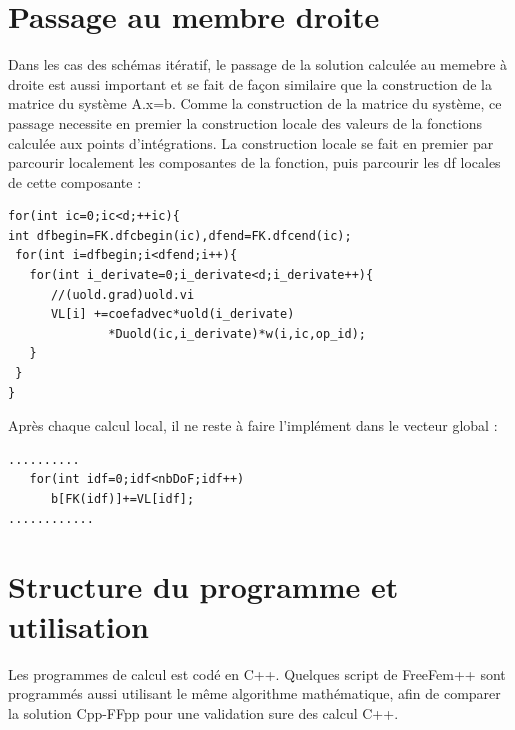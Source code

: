 \documentclass{book}
\begin{document}
\section{Passage au membre droite}
Dans les cas des schémas itératif, le passage de la solution calculée au memebre à droite est aussi important et se fait de façon similaire que la construction de la matrice du système A.x=b. Comme la construction de la matrice du système, ce passage necessite en premier la construction locale des valeurs de la fonctions calculée aux points d'intégrations. La construction locale se fait en premier par parcourir localement les composantes de la fonction, puis parcourir les df locales de cette composante : 
\begin{lstlisting}
for(int ic=0;ic<d;++ic){
int dfbegin=FK.dfcbegin(ic),dfend=FK.dfcend(ic);
 for(int i=dfbegin;i<dfend;i++){
   for(int i_derivate=0;i_derivate<d;i_derivate++){
      //(uold.grad)uold.vi
      VL[i] +=coefadvec*uold(i_derivate)
              *Duold(ic,i_derivate)*w(i,ic,op_id);
   }
 }
}
\end{lstlisting}
Après chaque calcul local, il ne reste à faire l'implément dans le vecteur global :
\begin{lstlisting}
..........
   for(int idf=0;idf<nbDoF;idf++) 
      b[FK(idf)]+=VL[idf];
............
\end{lstlisting}
\section{Structure du programme et utilisation}
Les programmes de calcul est codé en C++. Quelques script de FreeFem++ sont programmés aussi utilisant le même algorithme mathématique, afin de comparer la solution Cpp-FFpp pour une validation sure des calcul C++.
\end{document}
